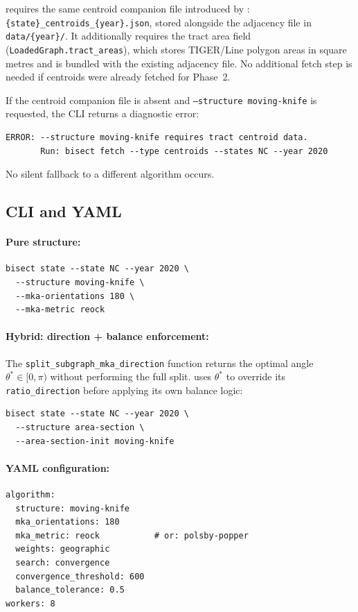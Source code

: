\mka{} requires the same centroid companion file introduced by \cvdgeo{}:
\texttt{\{state\}\_centroids\_\{year\}.json}, stored alongside the adjacency
file in \texttt{data/\{year\}/}.
It additionally requires the tract area field (\texttt{LoadedGraph.tract\_areas}),
which stores TIGER/Line polygon areas in square metres and is bundled with
the existing adjacency file.
No additional fetch step is needed if centroids were already fetched for
\cvdgeo{} Phase~2.

If the centroid companion file is absent and \texttt{--structure moving-knife}
is requested, the CLI returns a diagnostic error:
\begin{verbatim}
ERROR: --structure moving-knife requires tract centroid data.
       Run: bisect fetch --type centroids --states NC --year 2020
\end{verbatim}
No silent fallback to a different algorithm occurs.

\subsection{CLI and YAML}
\label{subsec:cli}

\paragraph{Pure \mka{} structure:}
\begin{verbatim}
bisect state --state NC --year 2020 \
  --structure moving-knife \
  --mka-orientations 180 \
  --mka-metric reock
\end{verbatim}

\paragraph{Hybrid: \mka{} direction + \areasec{} balance enforcement:}
The \texttt{split\_subgraph\_mka\_direction} function returns the optimal
angle $\theta^* \in [0, \pi)$ without performing the full split.
\areasec{} uses $\theta^*$ to override its \texttt{ratio\_direction} before
applying its own balance logic:
\begin{verbatim}
bisect state --state NC --year 2020 \
  --structure area-section \
  --area-section-init moving-knife
\end{verbatim}

\paragraph{YAML configuration:}
\begin{verbatim}
algorithm:
  structure: moving-knife
  mka_orientations: 180
  mka_metric: reock           # or: polsby-popper
  weights: geographic
  search: convergence
  convergence_threshold: 600
  balance_tolerance: 0.5
workers: 8
\end{verbatim}

